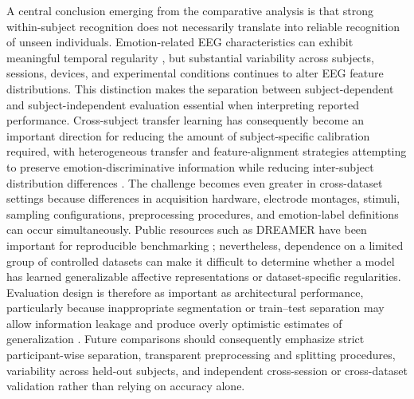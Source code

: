 \documentclass{WileyMSP-template}
\begin{document}
A central conclusion emerging from the comparative analysis is that strong within-subject recognition does not necessarily translate into reliable recognition of unseen individuals. Emotion-related EEG characteristics can exhibit meaningful temporal regularity \cite{zheng2019stablepatterns}, but substantial variability across subjects, sessions, devices, and experimental conditions continues to alter EEG feature distributions. This distinction makes the separation between subject-dependent and subject-independent evaluation essential when interpreting reported performance. Cross-subject transfer learning has consequently become an important direction for reducing the amount of subject-specific calibration required, with heterogeneous transfer and feature-alignment strategies attempting to preserve emotion-discriminative information while reducing inter-subject distribution differences \cite{zheng2020heterotransfer,peng2022jfaglp}. The challenge becomes even greater in cross-dataset settings because differences in acquisition hardware, electrode montages, stimuli, sampling configurations, preprocessing procedures, and emotion-label definitions can occur simultaneously. Public resources such as DREAMER have been important for reproducible benchmarking \cite{katsigiannis2017dreamer}; nevertheless, dependence on a limited group of controlled datasets can make it difficult to determine whether a model has learned generalizable affective representations or dataset-specific regularities. Evaluation design is therefore as important as architectural performance, particularly because inappropriate segmentation or train--test separation may allow information leakage and produce overly optimistic estimates of generalization \cite{brookshire2024leakage}. Future comparisons should consequently emphasize strict participant-wise separation, transparent preprocessing and splitting procedures, variability across held-out subjects, and independent cross-session or cross-dataset validation rather than relying on accuracy alone.
\end{document}
